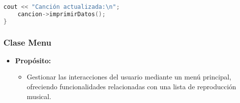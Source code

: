\documentclass[corference]{IEEEtran}
\begin{document}
\begin{flushleft}
\begin{sloppypar}
\begin{lstlisting}[language=C++, style=mystyle, caption={Cabecera de la Clase Menú}]
    cout << "Canción actualizada:\n";
    cancion->imprimirDatos();
}
            \end{lstlisting}
            \end{sloppypar}

            \subsubsection{Clase Menu}
                \begin{itemize}
                    \item \textbf{Propósito:} 
                    \begin{itemize}
                        \item Gestionar las interacciones del usuario mediante un menú principal, ofreciendo funcionalidades relacionadas con una lista de reproducción musical.
                    \end{itemize}
                \end{itemize}

\end{flushleft}
\end{document}
